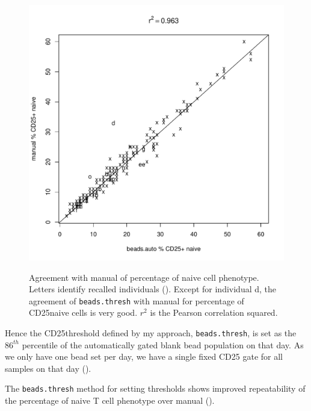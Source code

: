\begin{figure}
\begin{minipage}{.6\textwidth}
\includegraphics[width=\linewidth]{figures/naive-cd25pos-beads-manual-agreement.pdf}
\end{minipage}
{ Agreement with manual of percentage of \positive naive cell phenotype. }
{
  Letters identify recalled individuals ().
  Except for individual d, the agreement of \texttt{beads.thresh} with manual for percentage of CD25\positive naive cells
  is very good.  $r^2$ is the Pearson correlation squared.
}
\end{figure}

Hence the CD25\positive threshold defined by my approach, \texttt{beads.thresh}, is set as the $86^{th}$ percentile of the automatically gated blank bead population on that day.
As we only have one bead set per day, we have a single fixed CD25 gate for all samples on that day ().

The \texttt{beads.thresh} method for setting  thresholds  shows improved repeatability of the percentage of \positive naive T cell phenotype
over manual ().  


